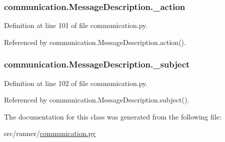 \subsubsection[{\+\_\+action}]{\setlength{\rightskip}{0pt plus 5cm}communication.\+Message\+Description.\+\_\+action\hspace{0.3cm}{\ttfamily [private]}}\label{classcommunication_1_1MessageDescription_a09e4c0c477233a7804e9895b7659983b}


Definition at line 101 of file communication.\+py.



Referenced by communication.\+Message\+Description.\+action().

\hypertarget{classcommunication_1_1MessageDescription_a76464dfce8257f1e8cf6dea51167919b}{}
\subsubsection[{\+\_\+subject}]{\setlength{\rightskip}{0pt plus 5cm}communication.\+Message\+Description.\+\_\+subject\hspace{0.3cm}{\ttfamily [private]}}\label{classcommunication_1_1MessageDescription_a76464dfce8257f1e8cf6dea51167919b}


Definition at line 102 of file communication.\+py.



Referenced by communication.\+Message\+Description.\+subject().



The documentation for this class was generated from the following file\+:\begin{DoxyCompactItemize}
\item 
src/runner/\hyperlink{communication_8py}{communication.\+py}\end{DoxyCompactItemize}
